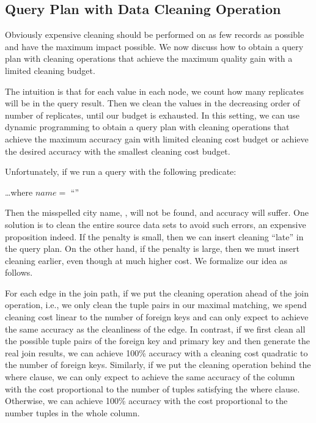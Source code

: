 



\subsection{Query Plan with Data Cleaning Operation}
\label{subsec:gain}

Obviously expensive cleaning should be performed on as few records as possible and have the maximum impact possible. We now discuss how to obtain a query plan with cleaning operations that achieve the maximum quality gain with a limited cleaning budget. 

The intuition is that for each value in each node, we count how many replicates  will be in the query result. Then we clean the values in the decreasing order of number of replicates, until our budget is exhausted.  In this setting, we can use dynamic programming to obtain a query plan with cleaning operations that achieve the maximum accuracy gain with limited cleaning cost budget or achieve the desired accuracy with the smallest cleaning cost budget. 


\iffalse
Unfortunately, if we run a query with the following predicate:

\vspace{.5em}
\dots \textsf{where} $name = $ ``''
\vspace{.5em}

\noindent Then the misspelled city name,  \ie {}, will not be found, and accuracy will suffer. One solution is to clean the entire source data sets to avoid such errors, an expensive proposition indeed. If the penalty is small, then we can insert cleaning ``late'' in the query plan. On the other hand, if the penalty is large, then we must insert cleaning earlier, even though at much higher cost. We formalize our idea as follows.


For each edge in the join path, if we put the cleaning operation ahead of the join operation, i.e., we only clean the tuple pairs in our maximal matching, we spend cleaning cost linear to the number of foreign keys and can only expect to achieve the same accuracy  as the cleanliness of the edge. In contrast, if we first clean all the possible tuple pairs of the foreign key and primary key and then generate the real join results, we can achieve 100\% accuracy with a cleaning cost quadratic to the number of foreign keys. Similarly, if we put the cleaning operation behind the where clause, we can only expect to achieve the same accuracy of the column with the cost proportional to the number of tuples satisfying the where clause. Otherwise, we can achieve 100\% accuracy with the cost proportional to the number tuples in the whole column.


